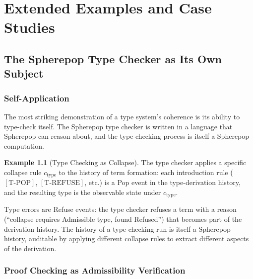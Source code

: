 \documentclass[12pt, a4paper, openany]{book}
\theoremstyle{plain}
\theoremstyle{definition}
\newtheorem{example}[theorem]{Example}
\theoremstyle{remark}
\begin{document}
\part{Extended Examples and Case Studies}

\chapter{The Spherepop Type Checker as Its Own Subject}

\section{Self-Application}

The most striking demonstration of a type system's coherence is its ability to
type-check itself. The Spherepop type checker is written in a language that
Spherepop can reason about, and the type-checking process is itself a Spherepop
computation.

\begin{example}[Type Checking as Collapse]
The type checker applies a specific collapse rule $c_{\mathrm{type}}$ to the
history of term formation: each introduction rule ($[\mathrm{T\text{-}POP}]$,
$[\mathrm{T\text{-}REFUSE}]$, etc.) is a Pop event in the type-derivation
history, and the resulting type is the observable state under $c_{\mathrm{type}}$.

Type errors are Refuse events: the type checker refuses a term with a reason
(``collapse requires Admissible type, found Refused'') that becomes part of
the derivation history. The history of a type-checking run is itself a Spherepop
history, auditable by applying different collapse rules to extract different
aspects of the derivation.
\end{example}

\section{Proof Checking as Admissibility Verification}
\end{document}
